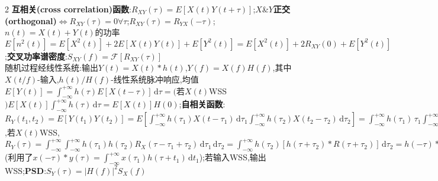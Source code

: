 \documentclass[UTF8,a4paper,10pt]{article}
\providecommand{\abs}[1]{\left\lvert#1\right\rvert}
\begin{document}
\begin{multicols}{2}
    \textbf{互相关(cross correlation)函数}:$R_{XY}(\tau)=E[X(t)Y(t+\tau)]$;$X$\&$Y$\textbf{正交(orthogonal)}$\Leftrightarrow R_{XY}(\tau)=0\forall\tau$;$R_{XY}(\tau)=R_{YX}(-\tau)$;$n(t)=X(t)+Y(t)$的功率$E[n^2(t)]=E[X^2(t)]+2E[X(t)Y(t)]+E[Y^2(t)]=E[X^2(t)]+2R_{XY}(0)+E[Y^2(t)]$;\textbf{交叉功率谱密度}:$S_{XY}(f)=\mathscr{F}[R_{XY}(\tau)]$\\
    随机过程经线性系统:输出$Y(t)=X(t)*h(t)$,$Y(f)=X(f)H(f)$,其中$X(t/f)$-输入,$h(t)/H(f)$-线性系统脉冲响应,均值$E[Y(t)]=\int_{-\infty}^{+\infty}h(\tau)E[X(t-\tau)]\,\mathrm{d}\tau=($若$X(t)$WSS$)E[X(t)]\int_{-\infty}^{+\infty}h(\tau)\,\mathrm{d}\tau=E[X(t)]H(0)$;\textbf{自相关函数}:$R_Y(t_1,t_2)=E[Y(t_1)Y(t_2)]=E[\int_{-\infty}^{+\infty}h(\tau_1)X(t-\tau_1)\,\mathrm{d}\tau_1\int_{-\infty}^{+\infty}h(\tau_2)X(t_2-\tau_2)\,\mathrm{d}\tau_2]=\int_{-\infty}^{+\infty}h(\tau_1)\,\tau_1\int_{-\infty}^{+\infty}h(\tau_2)E[X(t-\tau_1)X(t-\tau_2)]\,\mathrm{d}\tau_2$,若$X(t)$WSS,$R_Y(\tau)=\int_{-\infty}^{+\infty}\int_{-\infty}^{+\infty}h(\tau_1)h(\tau_2)R_X(\tau-\tau_1+\tau_2)\,\mathrm{d}\tau_1\,\mathrm{d}\tau_2=\int_{-\infty}^{+\infty}h(\tau_2)[h(\tau+\tau_2)*R(\tau+\tau_2)]\,\mathrm{d}\tau_2=h(-\tau)*h(\tau)*R_X(\tau)$(利用了$x(-\tau)*y(\tau)=\int_{-\infty}^{+\infty}x(\tau_1)h(\tau+t_1)\,\mathrm{d}t_1$);若输入WSS,输出WSS;\textbf{PSD}:$S_Y(\tau)=\abs{H(f)}^2S_X(f)$
\end{multicols}
\end{document}
